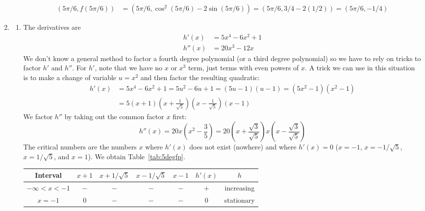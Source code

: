 \documentclass{article}
\begin{document}
\begin{enumerate}
\begin{enumerate}
\begin{align*}
      \\
      (5\pi/6,f(5\pi/6))
      &= (5\pi/6,\cos^2(5\pi/6)-2\sin(5\pi/6))
      = (5\pi/6,3/4-2(1/2)) = (5\pi/6,-1/4)
    \end{align*}
  \end{enumerate}
\item %
  \begin{enumerate}
  \item\label{prob:5deg} %
    The derivatives are
    \begin{align*}
      h'(x) &= 5x^4 -6x^2 + 1 \\
      h''(x) &= 20x^3 - 12x
    \end{align*}
    We don't know a general method to factor a fourth degree
    polynomial (or a third degree polynomial) so we have to rely on
    tricks to factor $h'$ and $h''$.  For $h'$, note that we have no
    $x$ or $x^3$ term, just terms with even powers of $x$.  A trick we
    can use in this situation is to make a change of variable $u=x^2$
    and then factor the resulting quadratic:
    \begin{align*}
      h'(x) &= 5x^4-6x^2+1 = 5u^2-6u+1 = (5u-1)(u-1) = (5x^2-1)(x^2-1)
      \\
      &= 5 (x+1) \left(x+\frac{1}{\sqrt{5}}\right) 
      \left(x-\frac{1}{\sqrt{5}}\right) (x-1)
    \end{align*}
    We factor $h''$ by taking out the common factor $x$ first:
    \begin{equation*}
      h''(x) = 20x\left(x^2-\frac{3}{5}\right) 
      = 20\left(x+\frac{\sqrt{3}}{\sqrt{5}}\right) x 
      \left(x-\frac{\sqrt{3}}{\sqrt{5}}\right)
    \end{equation*}
    The critical numbers are the numbers $x$ where $h'(x)$ does not
    exist (nowhere) and where $h'(x)=0$ ($x=-1$, $x=-1/\sqrt{5}$,
    $x=1/\sqrt{5}$, and $x=1$).  We obtain Table~\ref{tab:5degfp}.
    \begin{table}[htbp]
      \centering
      \begin{tabular}{|c|c|c|c|c|c|c|}
        \hline
        Interval                   & $x+1$ & $x+1/\sqrt{5}$ & $x-1/\sqrt{5}$ & $x-1$ & $h'(x)$ & $h$
        \\
        \hline\hline
        $-\infty<x<-1$             & $-$   & $-$            & $-$            & $-$   & $+$     & increasing
        \\
        \hline
        $x=-1$                     & $0$   & $-$            & $-$            & $-$   & $0$     & stationary

\end{tabular}
\end{table}
\end{enumerate}
\end{enumerate}
\end{document}
